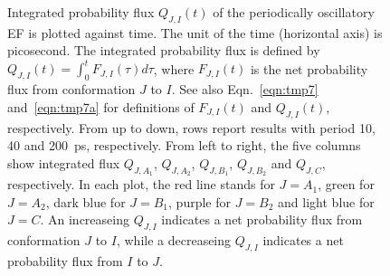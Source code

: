 \documentclass[a4paper,preprint,unsortedaddress,onecolumn]{revtex4-1}
\newcommand{\recheck}[1]{{\color{red} #1}}
\begin{document}
\begin{figure}
  \caption{
    Integrated probability flux $Q_{J,I}(t)$ of the periodically
    oscillatory EF is plotted against time. The unit of the
    time (horizontal axis) is picosecond.
    The integrated
    probability flux is defined by $Q_{J,I}(t) = \int_0^t F_{J,I}(\tau) d\tau$, where
    $F_{J,I}(t)$ is the net probability flux from conformation $J$ to $I$.
    See also Eqn.~\eqref{eqn:tmp7} and~\eqref{eqn:tmp7a} for definitions
    of $F_{J,I}(t)$ and $Q_{J,I}(t)$, respectively.
    From up to down, rows report results with  period 10, 40 and 200~ps, respectively.
    From left to right, the five
    columns show integrated flux $Q_{J,A_1}$, $Q_{J,A_2}$,
    $Q_{J,B_1}$, $Q_{J,B_2}$ and $Q_{J,C}$, respectively. In each plot,
    the red line stands for $J=A_1$, green for $J=A_2$, dark blue for $J=B_1$,
    purple for $J=B_2$ and light blue for $J=C$.
    \recheck{An increaseing $Q_{J,I}$ indicates a net probability
      flux from conformation $J$ to $I$,
      while a decreaseing $Q_{J,I}$ indicates a net probability
      flux from $I$ to $J$.
    }
  }
  \label{fig:tmp10}
\end{figure}
\end{document}
